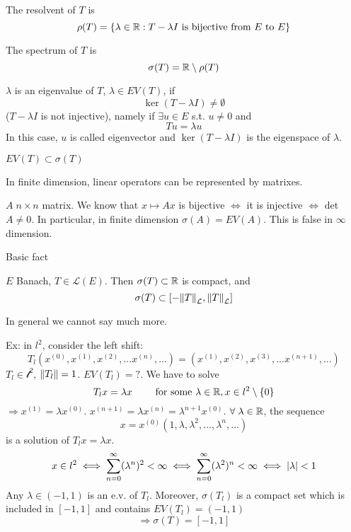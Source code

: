 \begin{definition}
    The resolvent of \(T\) is 
    \[
        \rho(T) = \{ \lambda \in \mathbb{R}: T - \lambda I \text{ is bijective from } E \text{ to } E\}
    \]
\end{definition}
\begin{definition}
    The spectrum of \(T\) is    
    \[
        \sigma(T) = \mathbb{R} \setminus \rho(T)
    \]
\end{definition}
\begin{definition}
    \(\lambda\) is an eigenvalue of \(T\), \(\lambda \in EV(T) \), if 
    \[
        \ker(T- \lambda I) \neq \emptyset
    \]
    (\(T - \lambda I\) is not injective), namely if \(\exists u \in E\) s.t. \(u \neq 0\) and
    \[
        T u = \lambda u
    \]
    In this case, \(u\) is called eigenvector and \(\ker(T-\lambda I)\) is the eigenspace of \(\lambda\).
\end{definition}
\begin{remark}
    \(EV(T) \subset \sigma(T)\)
\end{remark}
\begin{remark}
    In finite dimension, linear operators can be represented by matrixes.

    \(A \; n \times n\) matrix. We know that \(x \mapsto Ax\) is bijective \(\iff \) it is injective \(\iff \) det\(A \neq 0\). In particular, in finite dimension \(\sigma(A) = EV(A)\). This is false in \(\infty \) dimension.
\end{remark}

Basic fact
\begin{theorem}
    \(E\) Banach, \(T \in \mathcal{L}(E)\). Then \(\sigma(T) \subset \mathbb{R}\) is compact, and 
    \[
        \sigma(T) \subset \left[ - \norm{T}_\mathcal{L}, \norm{T}_\mathcal{L} \right]
    \]
\end{theorem}

In general we cannot say much more.

Ex: in \(l^2\), consider the left shift:
\[
    T_l(x^{(0)}, x^{(1)}, x^{(2)},... x^{(n)},...) = (x^{(1)}, x^{(2)}, x^{(3)},... x^{(n+1)},...)
\]
\(T_l \in \mathcal{l^2}\), \(\norm{T_l}=1\). \(EV(T_l)=?\). We have to solve
\[
    T_l x = \lambda x \qquad \text{ for some } \lambda \in \mathbb{R}, x \in l^2 \setminus \{0\}
\]
\(\Rightarrow x^{(1)}=\lambda x^{(0)}\). \(x^{(n+1)} = \lambda x^{(n)} = \lambda^{n+1} x^{(0)}\). \(\forall \; \lambda \in \mathbb{R}\), the sequence
\[
    x = x^{(0)} \left(1, \lambda,\lambda^2, ..., \lambda^n, ...\right)
\]
is a solution of \(T_l x = \lambda x\).
\[
    x \in l^2 \iff \sum_{n=0}^\infty (\lambda^n)^2 < \infty \iff \sum_{n=0}^\infty (\lambda^2)^n < \infty \iff \abs{\lambda} < 1
\]
Any \(\lambda \in (-1, 1)\) is an e.v. of \(T_l\). Moreover, \(\sigma(T_l)\) is a compact set which is included in \([-1, 1]\) and contains \(EV(T_l) =(-1, 1)\)
\[
    \Rightarrow \sigma(T) = [-1, 1]
\]
